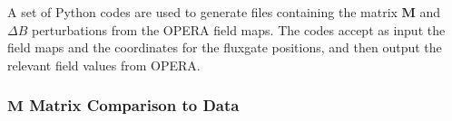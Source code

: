 A set of Python codes are used to generate files containing the matrix
$\mathbf{M}$ and $\Delta B$ perturbations from the OPERA field maps.
The codes accept as input the field maps and the coordinates for the
fluxgate positions, and then output the relevant field values from
OPERA.


\subsubsection{$\mathbf{M}$ Matrix Comparison to Data}





